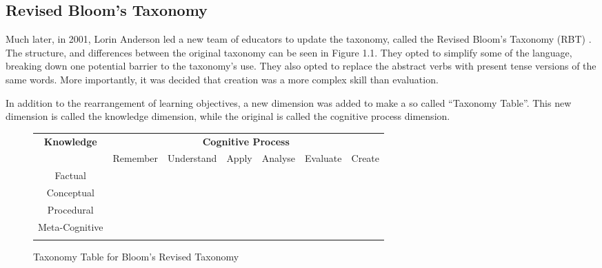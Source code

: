 \subsection{Revised Bloom's Taxonomy} \label{subsection:revised-blooms}

Much later, in 2001, Lorin Anderson led a new team of educators to update the taxonomy, called the Revised Bloom's Taxonomy (RBT) \cite{revised-blooms-taxonomy}. The structure, and differences between the original taxonomy can be seen in Figure 1.1. They opted to simplify some of the language, breaking down one potential barrier to the taxonomy's use. They also opted to replace the abstract verbs with present tense versions of the same words. More importantly, it was decided that creation was a more complex skill than evaluation.

In addition to the rearrangement of learning objectives, a new dimension was added to make a so called ``Taxonomy Table''. This new dimension is called the knowledge dimension, while the original is called the cognitive process dimension. \newline


\begin{figure}[h]
\begin{center}
\begin{tabular}{|c|c|c|c|c|c|c|}
\hline
\multirow{2}{*}{\textbf{Knowledge}}& \multicolumn{6}{c|}{\textbf{Cognitive Process}}  \\ \cline{2-7}
& Remember & Understand & Apply & Analyse & Evaluate &  Create \\ \hline 
Factual & \cellcolor{Gray9} & \cellcolor{Gray8} & \cellcolor{Gray7} & \cellcolor{Gray6} & \cellcolor{Gray5} & \cellcolor{Gray4} \\ \hhline{*7-}
Conceptual & \cellcolor{Gray8} & \cellcolor{Gray7} & \cellcolor{Gray6} & \cellcolor{Gray5} & \cellcolor{Gray4} & \cellcolor{Gray3}  \\ \hhline{*7-}
Procedural & \cellcolor{Gray7} & \cellcolor{Gray6} & \cellcolor{Gray5} & \cellcolor{Gray4} & \cellcolor{Gray3} & \cellcolor{Gray2} \\ \hhline{*7-}
Meta-Cognitive & \cellcolor{Gray6} &\cellcolor{Gray5} &\cellcolor{Gray4} &\cellcolor{Gray3} & \cellcolor{Gray2} & \cellcolor{Gray1} \\ \hhline{*7-}
\end{tabular}\caption{Taxonomy Table for Bloom's Revised Taxonomy}\label{fig:brt}
\end{center}
\end{figure}

